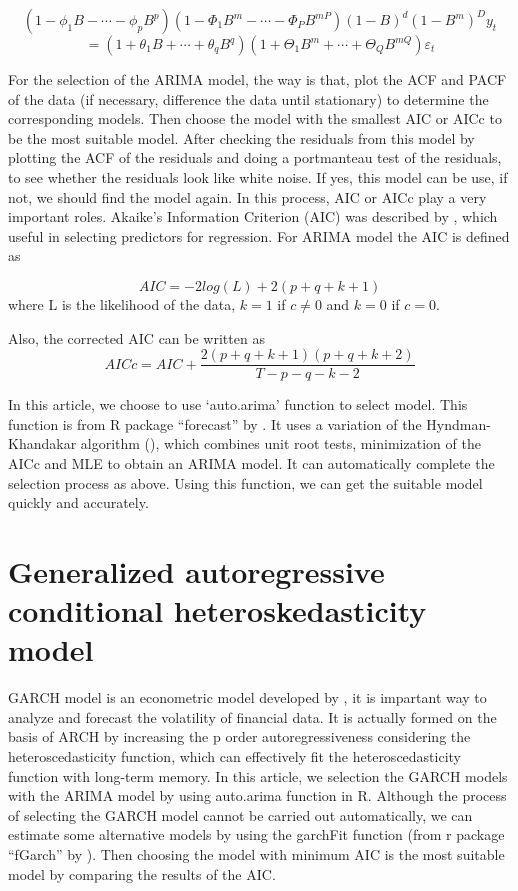 \documentclass{monashthesis}
\theoremstyle{definition}
\theoremstyle{definition}
\theoremstyle{definition}
\theoremstyle{remark}
\begin{document}
\[(1-\phi_1B-\cdots-\phi_pB^p)(1-\Phi_{1}B^{m}-\cdots-\Phi_{P}B^{mP})(1-B)^d(1-B^{m})^Dy_{t}\]
\[=(1+\theta_1B+\cdots+\theta_qB^q)(1+\Theta_{1}B^{m}+\cdots+\Theta_{Q}B^{mQ})\varepsilon_{t}\]

For the selection of the ARIMA model, the way is that, plot the ACF and
PACF of the data (if necessary, difference the data until stationary) to
determine the corresponding models. Then choose the model with the
smallest AIC or AICc to be the most suitable model. After checking the
residuals from this model by plotting the ACF of the residuals and doing
a portmanteau test of the residuals, to see whether the residuals look
like white noise. If yes, this model can be use, if not, we should find
the model again. In this process, AIC or AICc play a very important
roles. Akaike's Information Criterion (AIC) was described by
\textcite{A74}, which useful in selecting predictors for regression. For
ARIMA model the AIC is defined as

\[AIC=-2log(L)+2(p+q+k+1)\] where L is the likelihood of the data,
\(k=1\) if \(c\neq0\) and \(k=0\) if \(c=0\).

Also, the corrected AIC can be written as
\[AICc=AIC+\frac{2(p+q+k+1)(p+q+k+2)}{T-p-q-k-2}\]

In this article, we choose to use `auto.arima' function to select model.
This function is from R package ``forecast'' by \textcite{RH181}. It
uses a variation of the Hyndman-Khandakar algorithm (\textcite{RK08}),
which combines unit root tests, minimization of the AICc and MLE to
obtain an ARIMA model. It can automatically complete the selection
process as above. Using this function, we can get the suitable model
quickly and accurately.

\section{Generalized autoregressive conditional heteroskedasticity
model}\label{generalized-autoregressive-conditional-heteroskedasticity-model}

GARCH model is an econometric model developed by \textcite{R86}, it is
impartant way to analyze and forecast the volatility of financial data.
It is actually formed on the basis of ARCH by increasing the p order
autoregressiveness considering the heteroscedasticity function, which
can effectively fit the heteroscedasticity function with long-term
memory. In this article, we selection the GARCH models with the ARIMA
model by using auto.arima function in R. Although the process of
selecting the GARCH model cannot be carried out automatically, we can
estimate some alternative models by using the garchFit function (from r
package ``fGarch'' by \textcite{WD17}). Then choosing the model with
minimum AIC is the most suitable model by comparing the results of the
AIC.
\end{document}
